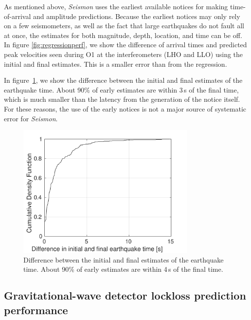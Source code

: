\documentclass[twocolumn, prl, superscriptaddress]{revtex4}
\begin{document}
As mentioned above, \emph{Seismon} uses the earliest available notices for making time-of-arrival and amplitude predictions. Because the earliest notices may only rely on a few seismometers, as well as the fact that large earthquakes do not fault all at once, the estimates for both magnitude, depth, location, and time can be off. In figure \ref{fig:regressionperf}, we show the difference of arrival times and predicted peak velocities seen during O1 at the interferometers (LHO and LLO) using the initial and final estimates. This is a smaller error than from the regression. 

In figure~\ref{fig:initialvsfinal}, we show the difference between the initial and final estimates of the earthquake time. About 90\% of early estimates are within 3\,s of the final time, which is much smaller than the latency from the generation of the notice itself.
For these reasons, the use of the early notices is not a major source of systematic error for \emph{Seismon}.

\begin{figure}[t]
\hspace*{-0.5cm}
 \includegraphics[width=3.5in]{lockloss_est_timediff.pdf}
 \caption{Difference between the initial and final estimates of the earthquake time. About 90\% of early estimates are within 4\,s of the final time.}
 \label{fig:initialvsfinal}
\end{figure}

\subsection{Gravitational-wave detector lockloss prediction performance}
\end{document}
